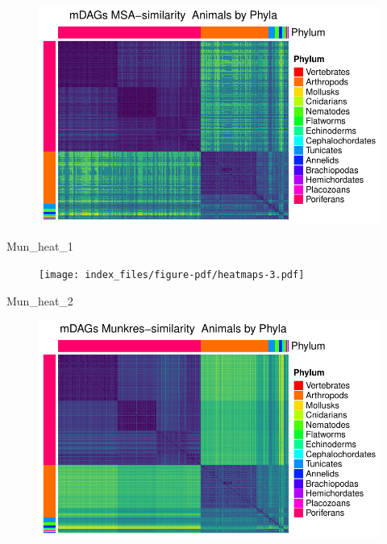 \documentclass[
  letterpaper,
  DIV=11,
  numbers=noendperiod]{scrreprt}
\newenvironment{Shaded}{}{}
\newcommand{\NormalTok}[1]{\textcolor[rgb]{0.67,0.70,0.75}{#1}}
\begin{document}
\begin{figure}[H]

{\centering \includegraphics[width=1\textwidth,height=\textheight]{index_files/figure-pdf/heatmaps-2.pdf}

}

\end{figure}

\begin{Shaded}
\begin{Highlighting}[]
\NormalTok{Mun\_heat\_1}
\end{Highlighting}
\end{Shaded}

\begin{figure}[H]

{\centering \texttt{[image: index\_files/figure-pdf/heatmaps-3.pdf]}

}

\end{figure}

\begin{Shaded}
\begin{Highlighting}[]
\NormalTok{Mun\_heat\_2}
\end{Highlighting}
\end{Shaded}

\begin{figure}[H]

{\centering \includegraphics[width=1\textwidth,height=\textheight]{index_files/figure-pdf/heatmaps-4.pdf}

}

\end{figure}
\end{document}
